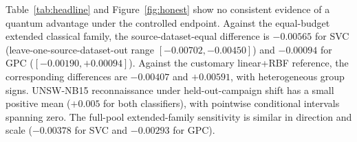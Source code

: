 \documentclass[referee,lineno,pdflatex,sn-vancouver-num]{sn-jnl}
\theoremstyle{thmstyleone}%
\theoremstyle{thmstyletwo}%
\theoremstyle{thmstylethree}%
\begin{document}
Table~\ref{tab:headline} and Figure~\ref{fig:honest} show no consistent evidence of a quantum advantage under the controlled endpoint. Against the equal-budget extended classical family, the source-dataset-equal difference is $-0.00565$ for SVC (leave-one-source-dataset-out range $[-0.00702,-0.00450]$) and $-0.00094$ for GPC ($[-0.00190,+0.00094]$). Against the customary linear+RBF reference, the corresponding differences are $-0.00407$ and $+0.00591$, with heterogeneous group signs. UNSW-NB15 reconnaissance under held-out-campaign shift has a small positive mean ($+0.005$ for both classifiers), with pointwise conditional intervals spanning zero. The full-pool extended-family sensitivity is similar in direction and scale ($-0.00378$ for SVC and $-0.00293$ for GPC).

\end{document}
